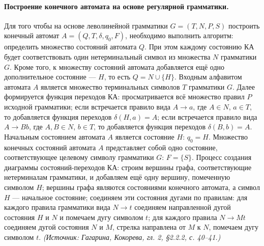 \documentclass[a4paper,12pt]{article}
\begin{document}
\paragraph{Построение конечного автомата на основе регулярной грамматики.}
Для того чтобы на основе леволинейной грамматики \(G=(T,N,P,S)\) построить конечный автомат \(A=(Q,T,\delta,q_0,F)\), необходимо выполнить алгоритм: определить множество состояний автомата \(Q\). При этом каждому состоянию КА будет соответствовать один нетерминальный символ из множества \(N\) грамматики \(G\). Кроме того, к множеству состояний автомата добавляется ещё одно дополнительное состояние — \(H\), то есть \(Q=N\cup\{H\}\). Входным алфавитом автомата \(A\) является множество терминальных символов \(T\) грамматики \(G\). Далее формируется функция переходов КА: просматривается всё множество правил \(P\) исходной грамматики; если встречается правило вида \(A\to a\), где \(A\in N\), \(a\in T\), то добавляется функция переходов \(\delta(H,a)=A\); если встречается правило вида \(A\to Bb\), где \(A,B\in N\), \(b\in T\), то добавляется функция переходов \(\delta(B,b)=A\). Начальным состоянием автомата \(A\) является состояние \(H\): \(q_0=H\). Множество конечных состояний автомата \(A\) представляет собой одно состояние, соответствующее целевому символу грамматики \(G\): \(F=\{S\}\). Процесс создания диаграммы состояний-переходов КА: строим вершины графа, соответствующие нетерминалам грамматики, и добавляем ещё одну вершину, помеченную символом \(H\); вершины графа являются состояниями конечного автомата, а символ \(H\) — начальное состояние; соединяем эти состояния дугами по правилам: для каждого правила грамматики вида \(N\to t\) соединяем направленной дугой состояния \(H\) и \(N\) и помечаем дугу символом \(t\); для каждого правила \(N\to Mt\) соединяем дугой состояния \(N\) и \(M\), стрелка направлена от \(M\) к \(N\), помечаем дугу символом \(t\).
\textit{(Источник: Гагарина, Кокорева, гл. 2, §2.2.2, с. 40--41.)}
\end{document}
